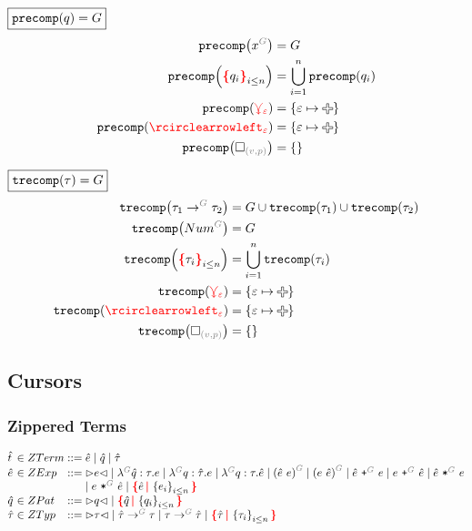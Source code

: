 \noindent $\boxed{\operatorname{\texttt{precomp}}\mathopen{}\left(q\right)\mathclose{} = G}$
%
\begin{align*}
  \precomp{\pVar{G}{x}} &= G
  \\
  \precomp{\conflictHole{q_i}_{i \leq n}} &= \bigcup_{i=1}^n \precomp{q_i}
  \\
  \precomp{\multiVertex{\e}} &= \SetOf{\e \mapsto \Plus}
  \\
  \precomp{\cycleVertex{\e}} &= \SetOf{\e \mapsto \Plus}
  \\
  \precomp{\emptyHole{v}{p}} &= \SetOf{}
\end{align*}

\noindent $\boxed{\operatorname{\texttt{trecomp}}\mathopen{}\left(\tau\right)\mathclose{} = G}$
%
\begin{align*}
  \trecomp{\tArrow{G}{\tau_1}{\tau_2}}
    &= G \cup \trecomp{\tau_1} \cup \trecomp{\tau_2}
  \\
  \trecomp{\tNum{G}} &= G
  \\
  \trecomp{\conflictHole{\tau_i}_{i \leq n}} &= \bigcup_{i=1}^n \trecomp{\tau_i}
  \\
  \trecomp{\multiVertex{\e}} &= \SetOf{\e \mapsto \Plus}
  \\
  \trecomp{\cycleVertex{\e}} &= \SetOf{\e \mapsto \Plus}
  \\
  \trecomp{\emptyHole{v}{p}} &= \SetOf{}
\end{align*}


\subsection{Cursors}


\subsubsection{Zippered Terms}

\[
  \arraycolsep=0pt
  \begin{array}{lcllll}
    \Z{t} & {}\in{} & ZTerm & {}::={} &
      \Z{e}
      \mid \Z{q}
      \mid \Z{\tau}
    \\
    \Z{e} & {}\in{} & ZExp & {}::={} &
      \cursor{e}
      \mid \eFun{G}{\Z{q}}{\tau}{e}
      \mid \eFun{G}{q}{\Z{\tau}}{e}
      \mid \eFun{G}{q}{\tau}{\Z{e}}
      \mid \eApp{G}{\Z{e}}{e}
      \mid \eApp{G}{e}{\Z{e}}
      \mid \ePlus{G}{\Z{e}}{e}
      \mid \ePlus{G}{e}{\Z{e}}
      \mid \eTimes{G}{\Z{e}}{e}
      \\
    &&&&
      \mid \eTimes{G}{e}{\Z{e}}
      \mid \conflictHole{\Z{e}, \SetOf{e_i}_{i \leq n}}
    \\
    \Z{q} & {}\in{} & ZPat & {}::={} &
      \cursor{q}
      \mid \conflictHole{\Z{q}, \SetOf{q_i}_{i \leq n}}
    \\
    \Z{\tau} & {}\in{} & ZTyp & {}::={} &
      \cursor{\tau}
      \mid \tArrow{G}{\Z{\tau}}{\tau}
      \mid \tArrow{G}{\tau}{\Z{\tau}}
      \mid \conflictHole{\Z{\tau}, \SetOf{\tau_i}_{i \leq n}}
    \\
  \end{array}
\]

